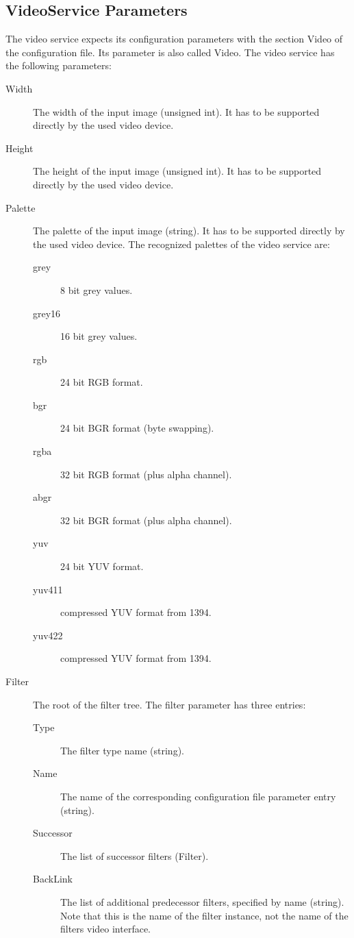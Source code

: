 \subsection{VideoService Parameters}

The video service expects its configuration parameters with the
section Video of the configuration file. Its parameter is
also called Video. The
video service has the following parameters:

\begin{description}
\item[Width] The width of the input image (unsigned int).
  It has to be supported directly by the used video device.
\item[Height] The height of the input image (unsigned int).
  It has to be supported directly by the used video device.
\item[Palette] The palette of the input image (string).
  It has to be supported directly by the used video device.
  The recognized palettes of the video service are:
  \begin{description}
  \item[grey] 8 bit grey values.
  \item[grey16] 16 bit grey values.
  \item[rgb] 24 bit RGB format.
  \item[bgr] 24 bit BGR format (byte swapping).
  \item[rgba] 32 bit RGB format (plus alpha channel).
  \item[abgr] 32 bit BGR format (plus alpha channel).
  \item[yuv] 24 bit YUV format.
  \item[yuv411] compressed YUV format from 1394.
  \item[yuv422] compressed YUV format from 1394.
  \end{description}
\item[Filter] The root of the filter tree. The filter parameter
  has three entries:
  \begin{description}
  \item[Type] The filter type name (string).
  \item[Name] The name of the corresponding configuration file
    parameter entry (string).
    \item[Successor] The list of successor filters (Filter).
    \item[BackLink] The list of additional predecessor filters,
      specified by name (string). Note that this is the name of the
      filter instance, not the name of the filters video interface.
  \end{description}
\end{description}

